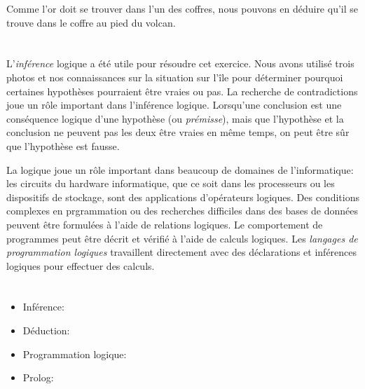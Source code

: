 {{Comme l’or doit se trouver dans l’un des coffres, nous pouvons en déduire qu’il se trouve dans le coffre au pied du volcan.



\section*{\BrochureItsInformatics}
L’\emph{inférence} logique a été utile pour résoudre cet exercice. Nous avons utilisé trois photos et nos connaissances sur la situation sur l’île pour déterminer pourquoi certaines hypothèses pourraient être vraies ou pas. La recherche de contradictions joue un rôle important dans l’inférence logique. Lorsqu’une conclusion est une conséquence logique d’une hypothèse (ou \emph{prémisse}), mais que l’hypothèse et la conclusion ne peuvent pas les deux être vraies en même temps, on peut être sûr que l’hypothèse est fausse.

La logique joue un rôle important dans beaucoup de domaines de l’informatique: les circuits du hardware informatique, que ce soit dans les processeurs ou les dispositifs de stockage, sont des applications d’opérateurs logiques. Des conditions complexes en prgrammation ou des recherches difficiles dans des bases de données peuvent être formulées à l’aide de relations logiques. Le comportement de programmes peut être décrit et vérifié à l’aide de calculs logiques. Les \emph{langages de programmation logiques} travaillent directement avec des déclarations et inférences logiques pour effectuer des calculs.



\section*{\BrochureWebsitesAndKeywords}
{\raggedright
\begin{itemize}
  \item Inférence: \href{https://fr.wikipedia.org/wiki/Inf\%C3\%A9rence_(logique)}{}
  \item Déduction: \href{https://fr.wikipedia.org/wiki/D\%C3\%A9duction_logique}{}
  \item Programmation logique: \href{https://fr.wikipedia.org/wiki/Programmation_logique}{}
  \item Prolog: \href{https://fr.wikipedia.org/wiki/Prolog}{}
\end{itemize}


}}}
